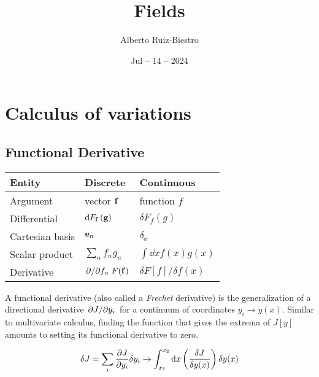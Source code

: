 \documentclass[letterpaper,12pt]{article}
\title{Fields}
\date{Jul -- 14 -- 2024}
\author{Alberto Ruiz-Biestro}
\begin{document}
\maketitle
\tableofcontents
\thispagestyle{empty}

\clearpage\pagestyle{fancy}
\section{Calculus of variations}

\subsection{Functional Derivative}


\begin{table}[h!]
  \centering
  \begin{tabular}{l l l}
    \hline\hline
    Entity & Discrete & Continuous\\ \hline
    Argument & vector $\vb{f}$ & function $f$\\
    Differential & $\dd{F_{\vb{f}}}(\vb{g})$ & $\delta F_{f}(g)$\\
    Cartesian basis & $\vb{e}_n$ & $\delta_x$\\
    Scalar product & \(\sum_nf_ng_n\) & \(\int\dd{x}f(x)g(x)\) \\
    Derivative & \(\pdv*{f_n}F(\vb{f})\) & \(\delta F[f]/\delta f(x)\) \\\hline\hline
  \end{tabular}
\end{table}

A functional derivative (also called a \emph{Frechet} derivative) is the generalization of a directional derivative $\pdv*{J}{y_i}$ for a continuum of coordinates $y_i\rightarrow y(x)$. Similar to multivariate calculus, finding the function that gives the extrema of $J[y]$ amounts to setting its functional derivative to zero.

\begin{equation}
\delta J=\sum_{i}\pdv{J}{y_i}\delta y_i\rightarrow\int_{x_1}^{x_2}\dd{x}\qty(\frac{\delta J}{\delta y(x)})\,\delta y(x)
\end{equation}
\end{document}

